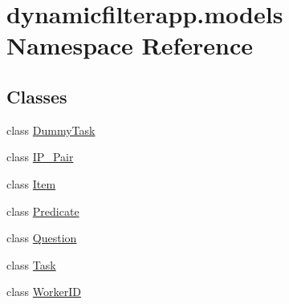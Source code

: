 \hypertarget{namespacedynamicfilterapp_1_1models}{}\section{dynamicfilterapp.\+models Namespace Reference}
\label{namespacedynamicfilterapp_1_1models}
\subsection*{Classes}
\begin{DoxyCompactItemize}
\item 
class \mbox{\hyperlink{classdynamicfilterapp_1_1models_1_1_dummy_task}{Dummy\+Task}}
\item 
class \mbox{\hyperlink{classdynamicfilterapp_1_1models_1_1_i_p___pair}{I\+P\+\_\+\+Pair}}
\item 
class \mbox{\hyperlink{classdynamicfilterapp_1_1models_1_1_item}{Item}}
\item 
class \mbox{\hyperlink{classdynamicfilterapp_1_1models_1_1_predicate}{Predicate}}
\item 
class \mbox{\hyperlink{classdynamicfilterapp_1_1models_1_1_question}{Question}}
\item 
class \mbox{\hyperlink{classdynamicfilterapp_1_1models_1_1_task}{Task}}
\item 
class \mbox{\hyperlink{classdynamicfilterapp_1_1models_1_1_worker_i_d}{Worker\+ID}}
\end{DoxyCompactItemize}
